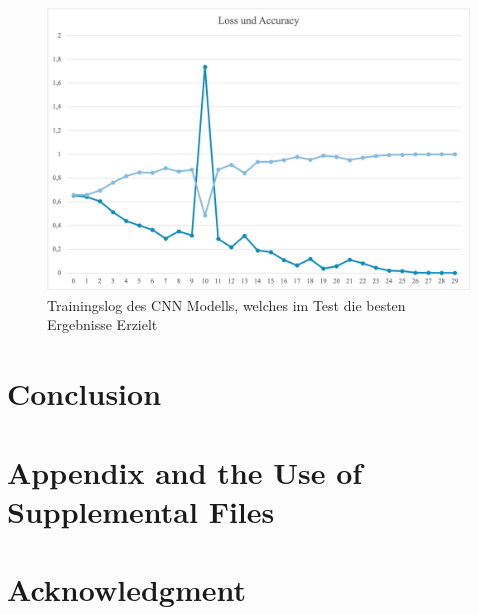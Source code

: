 \documentclass[journal,twoside,web]{ieeecolor}
\begin{document}
\begin{figure}[!t]
    \centerline{\includegraphics[width=\columnwidth]{Andi/Loss_Acc_Gewinner.png}}
    \caption{Trainingslog des CNN Modells, welches im Test die besten Ergebnisse Erzielt}
    \label{fig:fig1}
\end{figure}

\section{Conclusion}

\appendices

\section*{Appendix and the Use of Supplemental Files}


\section*{Acknowledgment}
\end{document}
